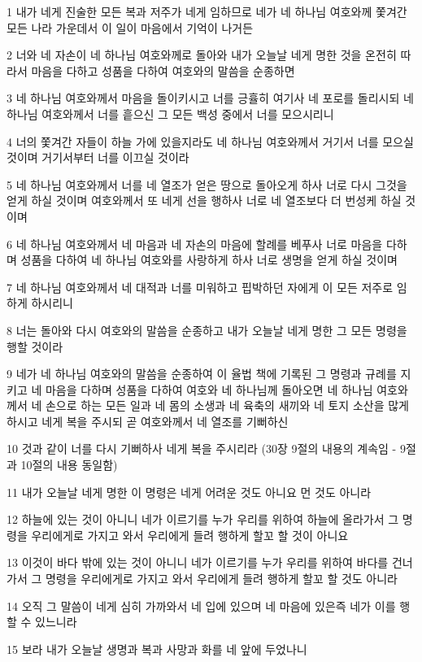 \par 1 내가 네게 진술한 모든 복과 저주가 네게 임하므로 네가 네 하나님 여호와께 쫓겨간 모든 나라 가운데서 이 일이 마음에서 기억이 나거든
\par 2 너와 네 자손이 네 하나님 여호와께로 돌아와 내가 오늘날 네게 명한 것을 온전히 따라서 마음을 다하고 성품을 다하여 여호와의 말씀을 순종하면
\par 3 네 하나님 여호와께서 마음을 돌이키시고 너를 긍휼히 여기사 네 포로를 돌리시되 네 하나님 여호와께서 너를 흩으신 그 모든 백성 중에서 너를 모으시리니
\par 4 너의 쫓겨간 자들이 하늘 가에 있을지라도 네 하나님 여호와께서 거기서 너를 모으실 것이며 거기서부터 너를 이끄실 것이라
\par 5 네 하나님 여호와께서 너를 네 열조가 얻은 땅으로 돌아오게 하사 너로 다시 그것을 얻게 하실 것이며 여호와께서 또 네게 선을 행하사 너로 네 열조보다 더 번성케 하실 것이며
\par 6 네 하나님 여호와께서 네 마음과 네 자손의 마음에 할례를 베푸사 너로 마음을 다하며 성품을 다하여 네 하나님 여호와를 사랑하게 하사 너로 생명을 얻게 하실 것이며
\par 7 네 하나님 여호와께서 네 대적과 너를 미워하고 핍박하던 자에게 이 모든 저주로 임하게 하시리니
\par 8 너는 돌아와 다시 여호와의 말씀을 순종하고 내가 오늘날 네게 명한 그 모든 명령을 행할 것이라
\par 9 네가 네 하나님 여호와의 말씀을 순종하여 이 율법 책에 기록된 그 명령과 규례를 지키고 네 마음을 다하며 성품을 다하여 여호와 네 하나님께 돌아오면 네 하나님 여호와께서 네 손으로 하는 모든 일과 네 몸의 소생과 네 육축의 새끼와 네 토지 소산을 많게 하시고 네게 복을 주시되 곧 여호와께서 네 열조를 기뻐하신
\par 10 것과 같이 너를 다시 기뻐하사 네게 복을 주시리라 (30장 9절의 내용의 계속임 - 9절과 10절의 내용 동일함)
\par 11 내가 오늘날 네게 명한 이 명령은 네게 어려운 것도 아니요 먼 것도 아니라
\par 12 하늘에 있는 것이 아니니 네가 이르기를 누가 우리를 위하여 하늘에 올라가서 그 명령을 우리에게로 가지고 와서 우리에게 들려 행하게 할꼬 할 것이 아니요
\par 13 이것이 바다 밖에 있는 것이 아니니 네가 이르기를 누가 우리를 위하여 바다를 건너가서 그 명령을 우리에게로 가지고 와서 우리에게 들려 행하게 할꼬 할 것도 아니라
\par 14 오직 그 말씀이 네게 심히 가까와서 네 입에 있으며 네 마음에 있은즉 네가 이를 행할 수 있느니라
\par 15 보라 내가 오늘날 생명과 복과 사망과 화를 네 앞에 두었나니
